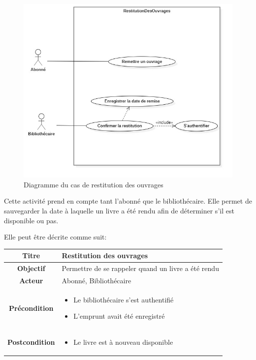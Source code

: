 \paragraph{}
\begin{figure}[h]
        \centering
        \includegraphics[width=1\textwidth]{restitutionDesOuvragesUseCase}
        \caption{Diagramme du cas de restitution des ouvrages}
        \label{image-restitutionDesOuvragesUseCase}
        \end{figure}
\par
Cette activité prend en compte tant l'abonné que le bibliothécaire. Elle permet de 
sauvegarder la date à laquelle un livre a été rendu afin de déterminer s'il est 
disponible ou pas. \par 
Elle peut être décrite comme suit: \par 
\begin{tabular}{|c|p{7cm}|}
        \hline
        \textbf{Titre} & Restitution des ouvrages \\
        \hline
        \textbf{Objectif} & Permettre de se rappeler quand un livre a été rendu \\
        \hline
        \textbf{Acteur} & Abonné, Bibliothécaire \\
        \hline
        \textbf{Précondition} & \begin{itemize}
                \item Le bibliothécaire s'est authentifié 
                \item L'emprunt avait été enregistré
        \end{itemize} \\
        \hline
        \textbf{Postcondition} & \begin{itemize}
                \item Le livre est à nouveau disponible
        \end{itemize} \\
        \hline
\end{tabular}
